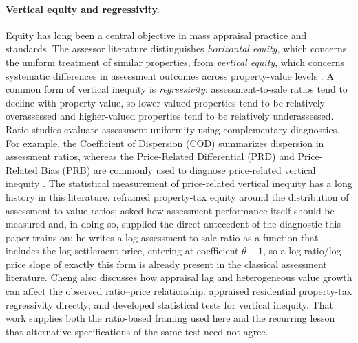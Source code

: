 \documentclass[10pt]{article}
\theoremstyle{definition}
\newcommand{\1}{\mathbf{1}}
\begin{document}
\paragraph{Vertical equity and regressivity.}
Equity has long been a central objective in mass appraisal practice and standards. The assessor literature distinguishes \emph{horizontal equity}, which concerns the uniform treatment of similar properties, from \emph{vertical equity}, which concerns systematic differences in assessment outcomes across property-value levels \cite{IAAO2013Ratio,cornia2006property,McMillenSingh2023}. A common form of vertical inequity is \emph{regressivity}: assessment-to-sale ratios tend to decline with property value, so lower-valued properties tend to be relatively overassessed and higher-valued properties tend to be relatively underassessed. {Ratio studies evaluate assessment uniformity using complementary diagnostics. For example, the Coefficient of Dispersion (COD) summarizes dispersion in assessment ratios, whereas the Price-Related Differential (PRD) and Price-Related Bias (PRB) are commonly used to diagnose price-related vertical inequity} \cite{IAAO2013Ratio,IAAO2023VerticalReview}. The statistical measurement of price-related vertical inequity has a long history in this literature. \textcite{PaglinFogarty1972} reframed property-tax equity around the distribution of assessment-to-value ratios; \textcite{Cheng1974} asked how assessment performance itself should be measured and, in doing so, supplied the direct antecedent of the diagnostic this paper trains on: he writes a log assessment-to-sale ratio as a function that includes the log settlement price, entering at coefficient $\theta-1$, so a log-ratio/log-price slope of exactly this form is already present in the classical assessment literature. Cheng also discusses how appraisal lag and heterogeneous value growth can affect the observed ratio--price relationship. \textcite{Edelstein1979} appraised residential property-tax regressivity directly; and \textcite{SundermanEtAl1990} developed statistical tests for vertical inequity. That work supplies both the ratio-based framing used here and the recurring lesson that alternative specifications of the same test need not agree.
\end{document}
